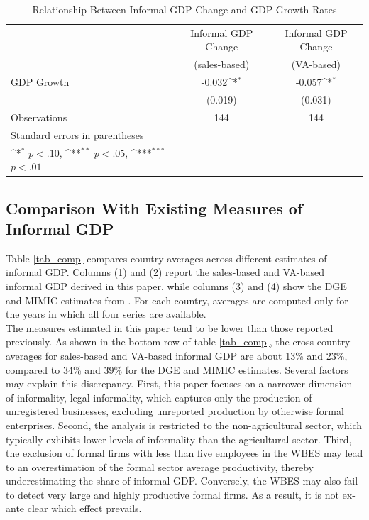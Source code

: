 \documentclass[letterpaper, 12pt]{article}
\begin{document}
    \begin{table}[ht!]
        \centering
        \caption{Relationship Between Informal GDP Change and GDP Growth Rates}\label{tab_gdpgr}
        {\def\sym#1{\ifmmode^{#1}\else\(^{#1}\)\fi}
        \begin{tabular}{l*{2}{c}}
            \hline\hline
            &Informal GDP Change       &Informal GDP Change               \\
            &(sales-based)       &(VA-based)                \\
            \hline
            GDP Growth      &     -0.032\sym{*} &      -0.057\sym{*} \\
                    &     (0.019)         &     (0.031)         \\
            \hline
            Observations        &      144         &      144         \\
            \hline\hline
            \footnotesize Standard errors in parentheses\\
            \footnotesize \sym{*} \(p<.10\), \sym{**} \(p<.05\), \sym{***} \(p<.01\)\\
            \end{tabular}
        }            
    \end{table}

        \subsection{Comparison With Existing Measures of Informal GDP}
        Table \ref{tab_comp} compares country averages across different estimates of informal GDP. Columns (1) and (2) report the sales-based and VA-based informal GDP derived in this paper, while columns (3) and (4) show the DGE and MIMIC estimates from \textcolor{blue}{\textcite{elginetal2021}}. For each country, averages are computed only for the years in which all four series are available.
        \\The measures estimated in this paper tend to be lower than those reported previously. As shown in the bottom row of table \ref{tab_comp}, the cross-country averages for sales-based and VA-based informal GDP are about 13\% and 23\%, compared to 34\% and 39\% for the DGE and MIMIC estimates. Several factors may explain this discrepancy. First, this paper focuses on a narrower dimension of informality, legal informality, which captures only the production of unregistered businesses, excluding unreported production by otherwise formal enterprises. Second, the analysis is restricted to the non-agricultural sector, which typically exhibits lower levels of informality than the agricultural sector. Third, the exclusion of formal firms with less than five employees in the WBES may lead to an overestimation of the formal sector average productivity, thereby underestimating the share of informal GDP. Conversely, the WBES may also fail to detect very large and highly productive formal firms. As a result, it is not ex-ante clear which effect prevails.
\end{document}
